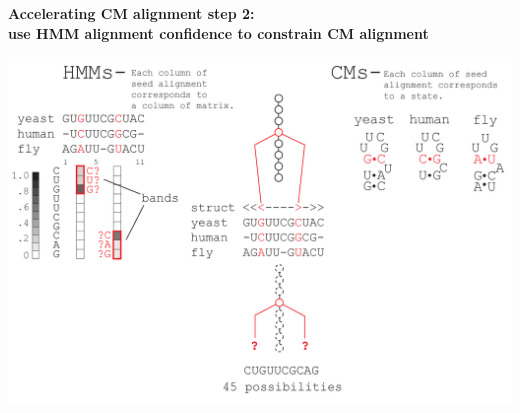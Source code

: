 \documentclass[landscape]{slides}
\begin{document}
\begin{slide}
\begin{center}

\textbf{Accelerating CM alignment step 2: \\ use HMM alignment
  confidence to constrain CM alignment}
\end{center}
\medskip
\small
\begin{center}
\includegraphics[width=8in]{figs/post_hmm_to_cm_map2_layer15}
\end{center}
\vfill
\end{slide}
\end{document}
